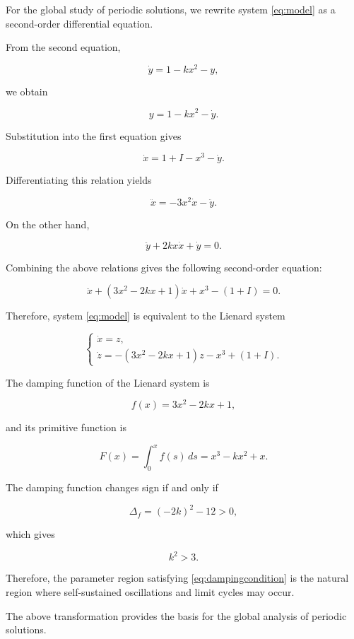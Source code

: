 \documentclass[11pt,reqno]{amsart}
\theoremstyle{plain}
\theoremstyle{definition}
\theoremstyle{remark}
\begin{document}
For the global study of periodic solutions, we rewrite system
\eqref{eq:model} as a second-order differential equation.

From the second equation,

\[
\dot y=1-kx^2-y,
\]

we obtain

\[
y=1-kx^2-\dot y .
\]

Substitution into the first equation gives

\[
\dot{x}=1+I-x^3-\dot y .
\]

Differentiating this relation yields

\[
\ddot{x}=-3x^2\dot{x}-\ddot{y}.
\]

On the other hand,

\[
\ddot{y}+2kx\dot{x}+\dot y=0.
\]

Combining the above relations gives the following second-order equation:

\begin{equation}
\label{eq:lienard}
\ddot{x}
+
(3x^2-2kx+1)\dot{x}
+
x^3-(1+I)=0 .
\end{equation}

Therefore, system \eqref{eq:model} is equivalent to the Lienard system

\begin{equation}
\label{eq:lienardplanar}
\begin{cases}
\dot{x}=z,\\[1mm]
\dot{z}=-(3x^2-2kx+1)z-x^3+(1+I).
\end{cases}
\end{equation}

The damping function of the Lienard system is

\[
f(x)=3x^2-2kx+1,
\]

and its primitive function is

\[
F(x)=\int_0^x f(s)\,ds
=x^3-kx^2+x .
\]

The damping function changes sign if and only if

\[
\Delta_f=(-2k)^2-12>0,
\]

which gives

\begin{equation}
\label{eq:dampingcondition}
k^2>3 .
\end{equation}

Therefore, the parameter region satisfying \eqref{eq:dampingcondition}
is the natural region where self-sustained oscillations and limit cycles
may occur.

The above transformation provides the basis for the global analysis of
periodic solutions.
\end{document}
